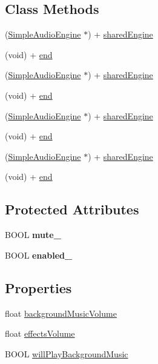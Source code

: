 \subsection*{Class Methods}
\begin{DoxyCompactItemize}
\item 
(\hyperlink{interfaceSimpleAudioEngine}{Simple\+Audio\+Engine} $\ast$) + \hyperlink{interfaceSimpleAudioEngine_aa571a8e565bfe5153919b3151d9f26f4}{shared\+Engine}
\item 
(void) + \hyperlink{interfaceSimpleAudioEngine_a2750af49fe41ee3fcf3d544f05ef3c73}{end}
\item 
(\hyperlink{interfaceSimpleAudioEngine}{Simple\+Audio\+Engine} $\ast$) + \hyperlink{interfaceSimpleAudioEngine_ac1b5d38a6da0e40254f29dd992bad73c}{shared\+Engine}
\item 
(void) + \hyperlink{interfaceSimpleAudioEngine_a2750af49fe41ee3fcf3d544f05ef3c73}{end}
\item 
(\hyperlink{interfaceSimpleAudioEngine}{Simple\+Audio\+Engine} $\ast$) + \hyperlink{interfaceSimpleAudioEngine_ac1b5d38a6da0e40254f29dd992bad73c}{shared\+Engine}
\item 
(void) + \hyperlink{interfaceSimpleAudioEngine_a2750af49fe41ee3fcf3d544f05ef3c73}{end}
\item 
(\hyperlink{interfaceSimpleAudioEngine}{Simple\+Audio\+Engine} $\ast$) + \hyperlink{interfaceSimpleAudioEngine_ac1b5d38a6da0e40254f29dd992bad73c}{shared\+Engine}
\item 
(void) + \hyperlink{interfaceSimpleAudioEngine_a2750af49fe41ee3fcf3d544f05ef3c73}{end}
\end{DoxyCompactItemize}
\subsection*{Protected Attributes}
\begin{DoxyCompactItemize}
\item 
\mbox{\label{interfaceSimpleAudioEngine_a9370736b2fbf3ca0927010f837c04a87}} 
B\+O\+OL {\bfseries mute\+\_\+}
\item 
\mbox{\label{interfaceSimpleAudioEngine_a5d889af8713eaf7bdd4900bd6319c580}} 
B\+O\+OL {\bfseries enabled\+\_\+}
\end{DoxyCompactItemize}
\subsection*{Properties}
\begin{DoxyCompactItemize}
\item 
float \hyperlink{interfaceSimpleAudioEngine_a7e28cfae58e49d3b6dd4a1ca9b8b54b5}{background\+Music\+Volume}
\item 
float \hyperlink{interfaceSimpleAudioEngine_a0c529082c00086142cdc19b92098453a}{effects\+Volume}
\item 
B\+O\+OL \hyperlink{interfaceSimpleAudioEngine_a2838b12d2c986358cb16d7527ad644ac}{will\+Play\+Background\+Music}
\end{DoxyCompactItemize}



